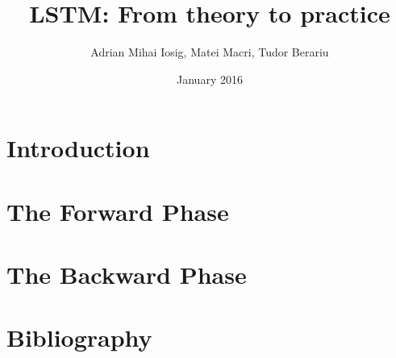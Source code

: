 \documentclass{article}
\title{LSTM: From theory to practice}
\author{Adrian Mihai Iosig, Matei Macri, Tudor Berariu}
\date{January 2016}
\begin{document}
\maketitle

\section{Introduction}

\section{The Forward Phase}

\section{The Backward Phase}

\appendix
\section{Bibliography}
\end{document}
